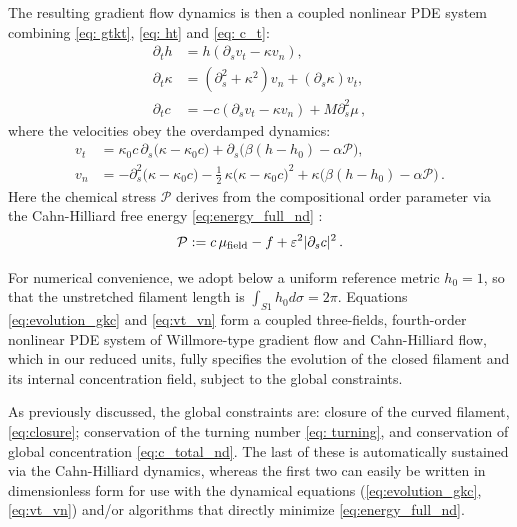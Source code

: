 \documentclass[
aip,
jcp,
reprint, 
floatfix
]{revtex4-1}
\begin{document}
\begin{widetext}
The resulting gradient flow dynamics is then a coupled nonlinear PDE system combining \eqref{eq: gtkt}, \eqref{eq: ht} and \eqref{eq: c_t}:
\begin{equation}
    \begin{split}
        \partial_t h &= h\left( \partial_s v_t - \kappa v_n \right), \\[3pt]
        \partial_t \kappa &= \left( \partial_s^2 + \kappa^2 \right) v_n + (\partial_s \kappa) v_t, \\[3pt]
        \partial_t c &=- c(\partial_s v_t - \kappa v_n) + M\partial_s^2 \mu\,, 
    \end{split}
    \label{eq:evolution_gkc}
\end{equation}
where the velocities obey the overdamped dynamics:
\begin{equation}
    \begin{split}
v_t &
= \kappa_0c\,\partial_s\!\big(\kappa-\kappa_0 c\big)
+\partial_s\big(\beta(h-h_0) - \alpha\mathcal P\big),
\\[4pt]
v_n &
= -\partial_s^2 \big(\kappa-\kappa_0 c\big)
-\frac12\,\kappa\big(\kappa-\kappa_0 c\big)^2
+\kappa \big(\beta(h-h_0) - \alpha\mathcal P\big)\,.
\end{split}
    \label{eq:vt_vn}
\end{equation}
Here the chemical stress $\mathcal{P}$ derives from the compositional order parameter via the Cahn-Hilliard free energy \eqref{eq:energy_full_nd}  \cite{kendon2001inertial}: 
\begin{equation} \label{eq: P_stress}
\mathcal P:=c\,\mu_{\rm field}-f +\varepsilon^2 |\partial_sc|^2 \,.
\end{equation}
\end{widetext}
For numerical convenience, we adopt below a uniform reference metric $h_0=1$, so that the unstretched filament length is $\int_{S 1} h_0 d \sigma=2 \pi$.
Equations \eqref{eq:evolution_gkc} and \eqref{eq:vt_vn} form a coupled three-fields, fourth-order nonlinear PDE system of Willmore-type gradient flow\cite{willmore1993riemannian} and Cahn-Hilliard flow, which in our reduced units, fully specifies the evolution of the closed filament and its internal concentration field, subject to the global constraints.

As previously discussed, the global constraints are: closure of the curved filament, \eqref{eq:closure}; conservation of the turning number \eqref{eq: turning}, and conservation of global concentration \eqref{eq:c_total_nd}. The last of these is automatically sustained via the Cahn-Hilliard dynamics, whereas the first two can easily be written in dimensionless form for use with the dynamical equations (\ref{eq:evolution_gkc}, \ref{eq:vt_vn}) and/or algorithms that directly minimize \eqref{eq:energy_full_nd}.
\end{document}
